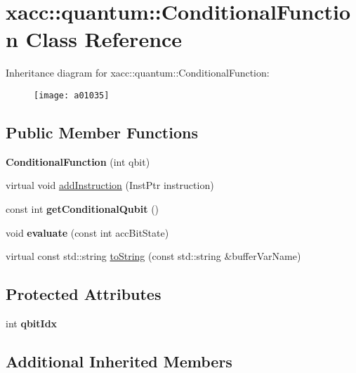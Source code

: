 \hypertarget{a01035}{}\section{xacc\+:\+:quantum\+:\+:Conditional\+Function Class Reference}
\label{a01035}
Inheritance diagram for xacc\+:\+:quantum\+:\+:Conditional\+Function\+:\begin{figure}[H]
\begin{center}
\leavevmode
\texttt{[image: a01035]}
\end{center}
\end{figure}
\subsection*{Public Member Functions}
\begin{DoxyCompactItemize}
\item 
\mbox{\label{a01035_aa28610a08ae04d62ccdd8359433100c3}} 
{\bfseries Conditional\+Function} (int qbit)
\item 
virtual void \hyperlink{a01035_a6aedad20f96390880efdc0a476b3273f}{add\+Instruction} (Inst\+Ptr instruction)
\item 
\mbox{\label{a01035_a804317333b6677a041a3071b5108c0df}} 
const int {\bfseries get\+Conditional\+Qubit} ()
\item 
\mbox{\label{a01035_a709c236a5beb62d9a3bd5265196fb6c9}} 
void {\bfseries evaluate} (const int acc\+Bit\+State)
\item 
virtual const std\+::string \hyperlink{a01035_aca7a5f849fece6fc28a904efee9a3370}{to\+String} (const std\+::string \&buffer\+Var\+Name)
\end{DoxyCompactItemize}
\subsection*{Protected Attributes}
\begin{DoxyCompactItemize}
\item 
\mbox{\label{a01035_a0310536801417c0eded28a4dea1efa44}} 
int {\bfseries qbit\+Idx}
\end{DoxyCompactItemize}
\subsection*{Additional Inherited Members}


